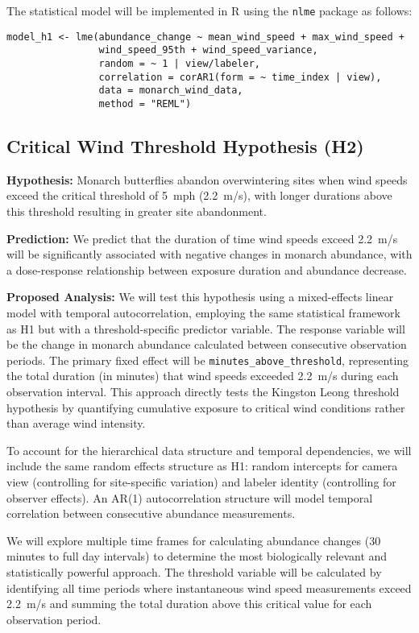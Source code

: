The statistical model will be implemented in R using the \texttt{nlme} package as follows:

\begin{verbatim}
model_h1 <- lme(abundance_change ~ mean_wind_speed + max_wind_speed + 
                wind_speed_95th + wind_speed_variance,
                random = ~ 1 | view/labeler,
                correlation = corAR1(form = ~ time_index | view),
                data = monarch_wind_data,
                method = "REML")
\end{verbatim}

\subsection{Critical Wind Threshold Hypothesis (H2)}

\textbf{Hypothesis:} Monarch butterflies abandon overwintering sites when wind speeds exceed the critical threshold of 5~mph (2.2~m/s), with longer durations above this threshold resulting in greater site abandonment.

\textbf{Prediction:} We predict that the duration of time wind speeds exceed 2.2~m/s will be significantly associated with negative changes in monarch abundance, with a dose-response relationship between exposure duration and abundance decrease.

\textbf{Proposed Analysis:}
We will test this hypothesis using a mixed-effects linear model with temporal autocorrelation, employing the same statistical framework as H1 but with a threshold-specific predictor variable. The response variable will be the change in monarch abundance calculated between consecutive observation periods. The primary fixed effect will be \texttt{minutes\_above\_threshold}, representing the total duration (in minutes) that wind speeds exceeded 2.2~m/s during each observation interval. This approach directly tests the Kingston Leong threshold hypothesis by quantifying cumulative exposure to critical wind conditions rather than average wind intensity.

To account for the hierarchical data structure and temporal dependencies, we will include the same random effects structure as H1: random intercepts for camera view (controlling for site-specific variation) and labeler identity (controlling for observer effects). An AR(1) autocorrelation structure will model temporal correlation between consecutive abundance measurements.

We will explore multiple time frames for calculating abundance changes (30 minutes to full day intervals) to determine the most biologically relevant and statistically powerful approach. The threshold variable will be calculated by identifying all time periods where instantaneous wind speed measurements exceed 2.2~m/s and summing the total duration above this critical value for each observation period.

